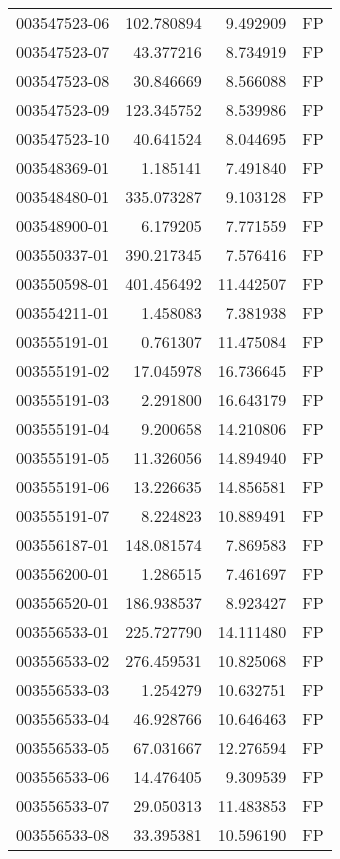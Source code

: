 \begin{tabular}{lrrl}
003547523-06 &  102.780894 &     9.492909 &   FP \\
003547523-07 &   43.377216 &     8.734919 &   FP \\
003547523-08 &   30.846669 &     8.566088 &   FP \\
003547523-09 &  123.345752 &     8.539986 &   FP \\
003547523-10 &   40.641524 &     8.044695 &   FP \\
003548369-01 &    1.185141 &     7.491840 &   FP \\
003548480-01 &  335.073287 &     9.103128 &   FP \\
003548900-01 &    6.179205 &     7.771559 &   FP \\
003550337-01 &  390.217345 &     7.576416 &   FP \\
003550598-01 &  401.456492 &    11.442507 &   FP \\
003554211-01 &    1.458083 &     7.381938 &   FP \\
003555191-01 &    0.761307 &    11.475084 &   FP \\
003555191-02 &   17.045978 &    16.736645 &   FP \\
003555191-03 &    2.291800 &    16.643179 &   FP \\
003555191-04 &    9.200658 &    14.210806 &   FP \\
003555191-05 &   11.326056 &    14.894940 &   FP \\
003555191-06 &   13.226635 &    14.856581 &   FP \\
003555191-07 &    8.224823 &    10.889491 &   FP \\
003556187-01 &  148.081574 &     7.869583 &   FP \\
003556200-01 &    1.286515 &     7.461697 &   FP \\
003556520-01 &  186.938537 &     8.923427 &   FP \\
003556533-01 &  225.727790 &    14.111480 &   FP \\
003556533-02 &  276.459531 &    10.825068 &   FP \\
003556533-03 &    1.254279 &    10.632751 &   FP \\
003556533-04 &   46.928766 &    10.646463 &   FP \\
003556533-05 &   67.031667 &    12.276594 &   FP \\
003556533-06 &   14.476405 &     9.309539 &   FP \\
003556533-07 &   29.050313 &    11.483853 &   FP \\
003556533-08 &   33.395381 &    10.596190 &   FP \\

\end{tabular}
